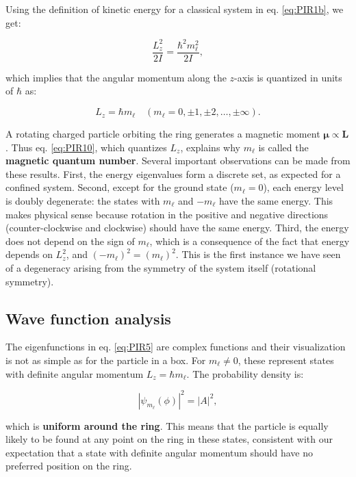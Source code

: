 \documentclass[
  english,
  9pt,
]{extbook}
\theoremstyle{definition}
\theoremstyle{definition}
\theoremstyle{definition}
\theoremstyle{definition}
\theoremstyle{remark}
\begin{document}
Using the definition of kinetic energy for a classical system in eq. \eqref{eq:PIR1b}, we get:

\begin{equation}
\frac{L_z^2}{2I} = \frac{\hbar^2 m_\ell^2}{2I},
\label{eq:PIR9}
\end{equation}

which implies that the angular momentum along the \(z\)-axis is quantized in units of \(\hbar\) as:

\begin{equation}
L_z = \hbar m_\ell \quad (m_\ell = 0, \pm1, \pm2, \ldots, \pm\infty).
\label{eq:PIR10}
\end{equation}

A rotating charged particle orbiting the ring generates a magnetic moment \(\boldsymbol{\mu} \propto \mathbf{L}\). Thus eq. \eqref{eq:PIR10}, which quantizes \(L_z\), explains why \(m_\ell\) is called the \textbf{magnetic quantum number}. Several important observations can be made from these results. First, the energy eigenvalues form a discrete set, as expected for a confined system. Second, except for the ground state (\(m_\ell = 0\)), each energy level is doubly degenerate: the states with \(m_\ell\) and \(-m_\ell\) have the same energy. This makes physical sense because rotation in the positive and negative directions (counter-clockwise and clockwise) should have the same energy. Third, the energy does not depend on the sign of \(m_\ell\), which is a consequence of the fact that energy depends on \(L_z^2\), and \((-m_\ell)^2 = (m_\ell)^2\). This is the first instance we have seen of a degeneracy arising from the symmetry of the system itself (rotational symmetry).

\subsection{Wave function analysis}\label{wave-function-analysis-1}

The eigenfunctions in eq. \eqref{eq:PIR5} are complex functions and their visualization is not as simple as for the particle in a box. For \(m_\ell \neq 0\), these represent states with definite angular momentum \(L_z = \hbar m_\ell\). The probability density is:

\begin{equation}
|\psi_{m_\ell}(\phi)|^2 = |A|^2,
\label{eq:PIR11}
\end{equation}

which is \textbf{uniform around the ring}. This means that the particle is equally likely to be found at any point on the ring in these states, consistent with our expectation that a state with definite angular momentum should have no preferred position on the ring.
\end{document}
